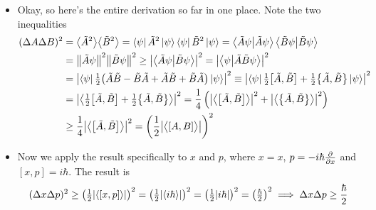 \documentclass[11pt, a4paper]{article}
\begin{document}
\begin{itemize}
	\item Okay, so here's the entire derivation so far in one place. Note the two inequalities
	\begin{align*}
		(\Delta A \Delta B)^{2} &= \big\langle \tilde{A}^{2} \big\rangle \big\langle \tilde{B}^{2} \big\rangle = \bra{\psi}\tilde{A}^{2}\ket{\psi} \bra{\psi}\tilde{B}^{2}\ket{\psi} = \braket{\tilde{A}\psi}{\tilde{A}\psi}\braket{\tilde{B}\psi}{\tilde{B}\psi}\\
		&= \norm{\tilde{A}\psi}^{2}\norm{\tilde{B}\psi}^{2} \geq \abs{\braket{\tilde{A}\psi}{\tilde{B}\psi}}^{2} = \abs{\braket{\psi}{\tilde{A}\tilde{B}\psi}}^{2}\\
		& = \abs{\bra{\psi}\tfrac{1}{2}\big(\tilde{A}\tilde{B} - \tilde{B}\tilde{A} + \tilde{A}\tilde{B} + \tilde{B}\tilde{A}\big)\ket{\psi} }^{2} \equiv  \abs{\bra{\psi}\tfrac{1}{2}\big[\tilde{A}, \tilde{B}\big] + \tfrac{1}{2}\big\{ \tilde{A}, \tilde{B}\big\}\ket{\psi} }^{2} \\
		& = \abs{\left\langle \tfrac{1}{2}\big[\tilde{A}, \tilde{B}\big] + \tfrac{1}{2}\big\{ \tilde{A}, \tilde{B}\big\} \right\rangle}^{2} = \frac{1}{4}\left(\abs{\big\langle \big[\tilde{A}, \tilde{B}\big] \big\rangle}^{2} + \abs{\big\langle \big\{\tilde{A}, \tilde{B}\big\} \big\rangle}^{2}\right) \\
		& \geq \frac{1}{4}\abs{\big\langle \big[\tilde{A}, \tilde{B}\big] \big\rangle}^{2} = \left(\frac{1}{2}\abs{\big\langle [A, B] \big\rangle}\right)^{2}
	\end{align*}
	
	\item Now we apply the result specifically to $ x $ and $ p $, where $ x = x $, $ p = -i\hbar \pdv{}{x} $ and $ [x, p] = i \hbar $. The result is
	\begin{equation*}
		(\Delta x \Delta p)^{2} \geq \left(\tfrac{1}{2}\abs{\langle [x, p] \rangle}\right)^{2} = \left(\tfrac{1}{2}\abs{\langle i \hbar \rangle}\right)^{2} = \left(\tfrac{1}{2}\abs{i\hbar}\right)^{2} = \left(\tfrac{\hbar}{2}\right)^{2} \implies \Delta x \Delta p \geq \frac{\hbar}{2}
	\end{equation*}

\end{itemize}
\end{document}
